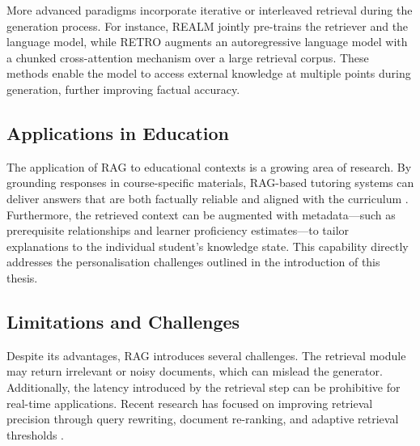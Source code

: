 More advanced paradigms incorporate iterative or interleaved retrieval during the generation process. For instance, REALM \cite{guu2020realm} jointly pre-trains the retriever and the language model, while RETRO \cite{borgeaud2022improving} augments an autoregressive language model with a chunked cross-attention mechanism over a large retrieval corpus. These methods enable the model to access external knowledge at multiple points during generation, further improving factual accuracy.

\subsection{Applications in Education}

The application of RAG to educational contexts is a growing area of research. By grounding responses in course-specific materials, RAG-based tutoring systems can deliver answers that are both factually reliable and aligned with the curriculum \cite{gao2023retrieval}. Furthermore, the retrieved context can be augmented with metadata---such as prerequisite relationships and learner proficiency estimates---to tailor explanations to the individual student's knowledge state. This capability directly addresses the personalisation challenges outlined in the introduction of this thesis.

\subsection{Limitations and Challenges}

Despite its advantages, RAG introduces several challenges. The retrieval module may return irrelevant or noisy documents, which can mislead the generator. Additionally, the latency introduced by the retrieval step can be prohibitive for real-time applications. Recent research has focused on improving retrieval precision through query rewriting, document re-ranking, and adaptive retrieval thresholds \cite{ram2023retrieval, shao2023retrieval}.
